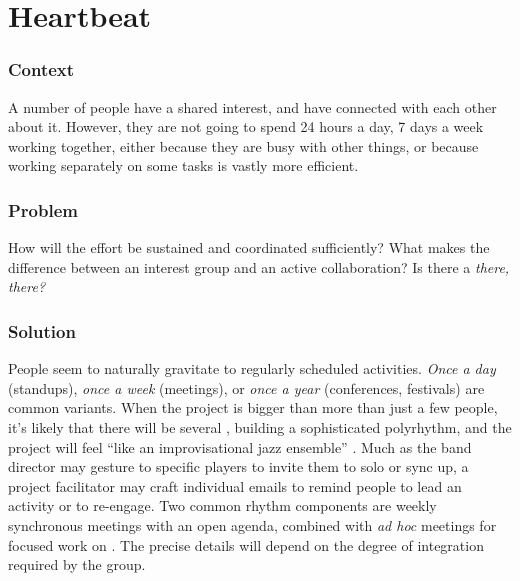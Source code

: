 \section{Heartbeat}\label{sec:Heartbeat}

\subsubsection*{Context}
A number of people have a shared interest, and have connected with each other about it.  However, they are not going to spend 24 hours a day, 7 days a week working together, either because they are busy with other things, or because working separately on some tasks is vastly more efficient.

\subsubsection*{Problem} How will the effort be sustained and coordinated sufficiently?  What makes the difference between an interest group and an active collaboration?  Is there a \emph{there, there?}

\subsubsection*{Solution} People seem to naturally gravitate to regularly scheduled activities.  \emph{Once a day} (standups), \emph{once a week} (meetings), or \emph{once a year} (conferences, festivals) are common variants.  When the project is bigger than more than just a few people, it's likely that there will be several , building a sophisticated polyrhythm, and the project will feel ``like an improvisational jazz ensemble'' \cite{david2001software}.  Much as the band director may gesture to specific players to invite them to solo or sync up, a project facilitator may craft individual emails to remind people to lead an activity or to re-engage.  Two common rhythm components are weekly synchronous meetings with an open agenda, combined with \emph{ad hoc} meetings for focused work on .  The precise details will depend on the degree of integration required by the group.

